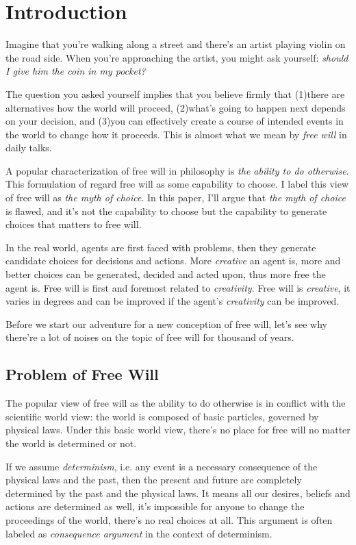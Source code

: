\section{Introduction}

Imagine that you're walking along a street and there's an artist playing violin on the road side. When you're approaching the artist, you might ask yourself: \emph{should I give him the coin in my pocket?}

The question you asked yourself implies that you believe firmly that (1)there are alternatives how the world will proceed, (2)what's going to happen next depends on your decision, and (3)you can effectively create a course of intended events in the world to change how it proceeds. This is almost what we mean by \emph{free will} in daily talks.

A popular characterization of free will in philosophy is \emph{the ability to do otherwise}. This formulation of regard free will as some capability to choose. I label this view of free will as \emph{the myth of choice}. In this paper, I'll argue that \emph{the myth of choice} is flawed, and it's not the capability to choose but the capability to generate choices that matters to free will.

In the real world, agents are first faced with problems, then they generate candidate choices for decisions and actions. More \emph{creative} an agent is, more and better choices can be generated, decided and acted upon, thus more free the agent is. Free will is first and foremost related to \emph{creativity}. Free will is \emph{creative}, it varies in degrees and can be improved if the agent's \emph{creativity} can be improved.

Before we start our adventure for a new conception of free will, let's see why there're a lot of noises on the topic of free will for thousand of years.

\subsection{Problem of Free Will}

The popular view of free will as the ability to do otherwise is in conflict with the scientific world view: the world is composed of basic particles, governed by physical laws. Under this basic world view, there’s no place for free will no matter the world is determined or not.

If we assume \emph{determinism}, i.e. any event is a necessary consequence of the physical laws and the past, then the present and future are completely determined by the past and the physical laws. It means all our desires, beliefs and actions are determined as well, it’s impossible for anyone to change the proceedings of the world, there’s no real choices at all. This argument is often labeled as \emph{consequence argument} in the context of determinism.

